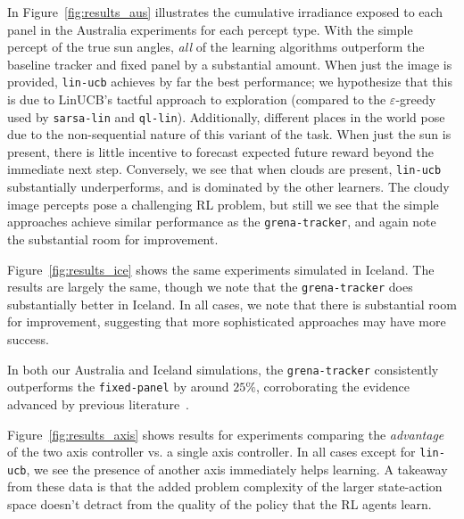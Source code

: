 \documentclass{article}
\begin{document}
{In Figure~\ref{fig:results_aus} illustrates the cumulative irradiance exposed to each panel in the Australia experiments for each percept type. With the simple percept of the true sun angles, {\it all} of the learning algorithms outperform the baseline tracker and fixed panel by a substantial amount. When just the image is provided, \texttt{lin-ucb} achieves by far the best performance; we hypothesize that this is due to LinUCB's  tactful approach to exploration (compared to the $\varepsilon$-greedy used by \texttt{sarsa-lin} and \texttt{ql-lin}). Additionally, different places in the world pose  due to the non-sequential nature of this variant of the task. When just the sun is present, there is little incentive to forecast expected future reward beyond the immediate next step. Conversely, we see that when clouds are present, \texttt{lin-ucb} substantially underperforms, and is dominated by the other learners. The cloudy image percepts pose a challenging RL problem, but still we see that the simple approaches achieve similar performance as the \texttt{grena-tracker}, and again note the substantial room for improvement.

Figure~\ref{fig:results_ice} shows the same experiments simulated in Iceland. The results are largely the same, though we note that the \texttt{grena-tracker} does substantially better in Iceland. In all cases, we note that there is substantial room for improvement, suggesting that more sophisticated approaches may have more success.

In both our Australia and Iceland simulations, the \texttt{grena-tracker} consistently outperforms the \texttt{fixed-panel} by around $25\%$, corroborating the evidence advanced by previous literature~\cite{Eke2012,mousazadeh2009review,clifford2004design}. %

Figure~\ref{fig:results_axis} shows results for experiments comparing the {\it advantage} of the two axis controller vs. a single axis controller. In all cases except for \texttt{lin-ucb}, we see the presence of another axis immediately helps learning. A takeaway from these data is that the added problem complexity of the larger state-action space doesn't detract from the quality of the policy that the RL agents learn.



}
\end{document}
